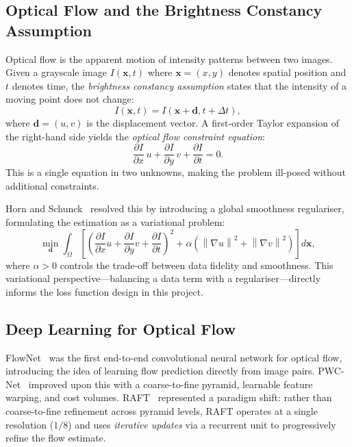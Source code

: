 \documentclass[11pt, a4paper]{article}
\newcommand{\pd}[2]{\frac{\partial #1}{\partial #2}}
\newcommand{\norm}[1]{\left\lVert #1 \right\rVert}
\newcommand{\vect}[1]{\bm{#1}}
\begin{document}
\subsection{Optical Flow and the Brightness Constancy Assumption}

Optical flow is the apparent motion of intensity patterns between two images.
Given a grayscale image $I(\vect{x}, t)$ where $\vect{x} = (x, y)$ denotes spatial position and $t$ denotes time, the \emph{brightness constancy assumption} states that the intensity of a moving point does not change:
\begin{equation}
    I(\vect{x}, t) = I(\vect{x} + \vect{d}, t + \Delta t),
    \label{eq:bca}
\end{equation}
where $\vect{d} = (u, v)$ is the displacement vector.
A first-order Taylor expansion of the right-hand side yields the \emph{optical flow constraint equation}:
\begin{equation}
    \pd{I}{x}\, u + \pd{I}{y}\, v + \pd{I}{t} = 0.
    \label{eq:ofce}
\end{equation}
This is a single equation in two unknowns, making the problem ill-posed without additional constraints.

Horn and Schunck~\cite{horn1981determining} resolved this by introducing a global smoothness regulariser, formulating the estimation as a variational problem:
\begin{equation}
    \min_{\vect{d}} \int_\Omega \left[ \left( \pd{I}{x} u + \pd{I}{y} v + \pd{I}{t} \right)^2 + \alpha \left( \norm{\nabla u}^2 + \norm{\nabla v}^2 \right) \right] d\vect{x},
    \label{eq:horn_schunck}
\end{equation}
where $\alpha > 0$ controls the trade-off between data fidelity and smoothness.
This variational perspective---balancing a data term with a regulariser---directly informs the loss function design in this project.

\subsection{Deep Learning for Optical Flow}

FlowNet~\cite{dosovitskiy2015flownet} was the first end-to-end convolutional neural network for optical flow, introducing the idea of learning flow prediction directly from image pairs.
PWC-Net~\cite{sun2018pwcnet} improved upon this with a coarse-to-fine pyramid, learnable feature warping, and cost volumes.
RAFT~\cite{teed2020raft} represented a paradigm shift: rather than coarse-to-fine refinement across pyramid levels, RAFT operates at a single resolution ($1/8$) and uses \emph{iterative updates} via a recurrent unit to progressively refine the flow estimate.
\end{document}
